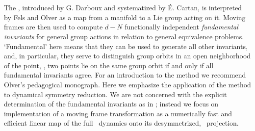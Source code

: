 \documentclass[preprint,number,sort&compress]{elsarticle}
\begin{document}
\section{\label{sec:mf} \Mframes}

The \mframes, introduced by G. Darboux and systematized by
\'E. Cartan, is interpreted by Fels and
Olver as a map from a manifold
to a Lie group acting on it. Moving frames are then used to
compute $d-N$ functionally independent \emph{fundamental
in\-vari\-ants} for general group actions in relation to general
equivalence problems. `Fundamental' here means that they can
be used to generate all other in\-vari\-ants, and, in particular,
they serve to distinguish group orbits in an open
neighborhood of the {\slice} point, \ie, two points lie on
the same group orbit if and only if all fundamental
in\-vari\-ants agree. For an introduction to the method we
recommend Olver's pedagogical monograph. Here we
emphasize the application of the method to dynamical symmetry
reduction. We are not concerned with the explicit
determination of the fundamental in\-vari\-ants as in
; instead we focus on
implementation of a moving frame transformation as a
numerically fast and efficient linear map of the full
\statesp\ dynamics onto its desymmetrized, \reducedsp\
projection.
\end{document}
